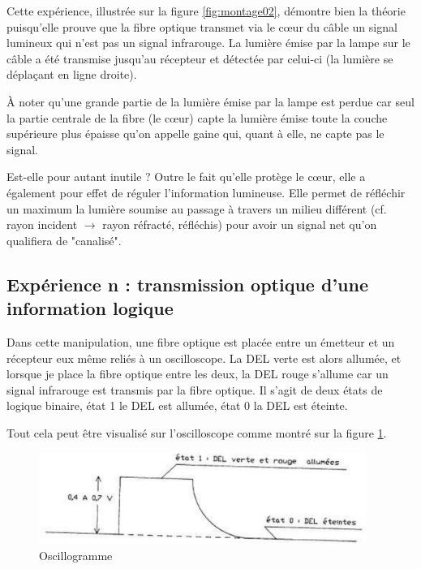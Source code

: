\documentclass[a4paper]{article}
\begin{document}
Cette expérience, illustrée sur la figure \ref{fig:montage02}, démontre bien la théorie puisqu’elle prouve que la fibre optique transmet via le cœur du câble un signal lumineux qui n’est pas un signal infrarouge. La lumière émise par la lampe sur le câble a été transmise jusqu'au récepteur et détectée par celui-ci (la lumière se déplaçant en ligne droite).

À noter qu’une grande partie de la lumière émise par la lampe est perdue car seul la partie centrale de la fibre (le cœur) capte la lumière émise toute la couche supérieure plus épaisse qu’on appelle gaine qui, quant à elle, ne capte pas le signal.

Est-elle pour autant inutile ? Outre le fait qu’elle protège le cœur, elle a également pour effet de réguler l’information lumineuse. Elle permet de réfléchir un maximum la lumière soumise au passage à travers un milieu différent (cf. rayon incident $ \rightarrow $ rayon réfracté, réfléchis) pour avoir un signal net qu’on qualifiera de "canalisé".










\subsection{Expérience n : transmission optique d’une information logique}





Dans cette manipulation, une fibre optique est placée entre un émetteur et un récepteur eux même reliés à un oscilloscope. La DEL verte est alors allumée, et lorsque je place la fibre optique entre les deux, la DEL rouge s’allume car un signal infrarouge est transmis par la fibre optique. Il s’agit de deux états de logique binaire, état 1 le DEL est allumée, état 0 la DEL est éteinte.

Tout cela peut être visualisé sur l’oscilloscope comme montré sur la figure \ref{fig:montage03}.

\begin{figure}[H]
    \centering
    \includegraphics[width=0.95\textwidth]{images/montage03.PNG}
    \caption{Oscillogramme}
    \label{fig:montage03}
\end{figure}
\end{document}
